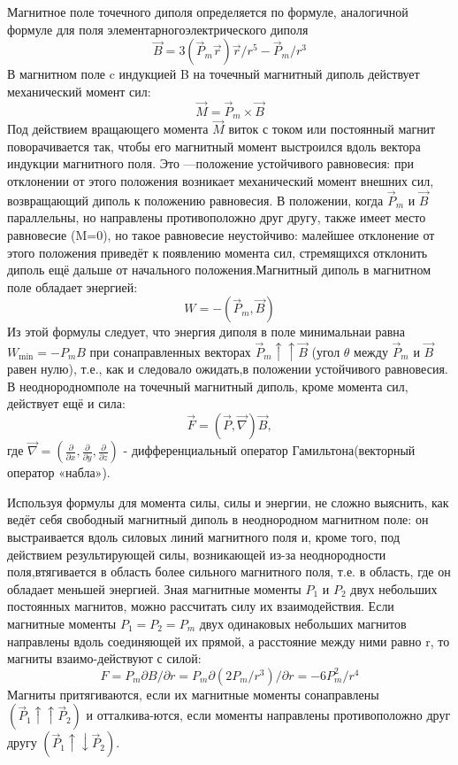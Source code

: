 \documentclass[a4paper, 12pt]{article}
\begin{document}
Магнитное поле точечного диполя определяется по формуле, аналогичной формуле для поля элементарногоэлектрического диполя
\begin{equation}\vec{B}=3\left(\vec{P}_{m} \vec{r}\right) \vec{r} / r^{5}-\vec{P}_{m} / r^{3}\end{equation}
В магнитном поле c индукцией B на точечный магнитный диполь действует механический момент сил:
\begin{equation}\vec{M}=\vec{P}_{m} \times \vec{B}\end{equation}
Под действием вращающего момента $\vec{M}$ виток с током или постоянный магнит поворачивается так, чтобы его магнитный момент выстроился вдоль вектора индукции магнитного поля. Это —положение устойчивого равновесия: при отклонении от этого положения возникает механический момент внешних сил, возвращающий диполь к положению равновесия. В положении, когда $\vec{P}_{m}$ и $\vec{B}$ параллельны, но направлены противоположно друг другу, также имеет место равновесие (M=0), но такое равновесие неустойчиво: малейшее отклонение от этого положения приведёт к появлению момента сил, стремящихся отклонить диполь ещё дальше от начального положения.Магнитный диполь в магнитном поле обладает энергией:
\begin{equation}W=-\left(\vec{P}_{m}, \vec{B}\right)\end{equation}
Из этой формулы следует, что энергия диполя в поле минимальнаи равна $W_{\min }=-P_{m} B$ при сонаправленных векторах $\vec{P}_{m} \uparrow \uparrow \vec{B}$ (угол $\theta$ между $\vec{P}_{m}$ и $\vec{B}$ равен нулю), т.е., как и следовало ожидать,в положении устойчивого равновесия.
В неоднородномполе на точечный магнитный диполь, кроме момента сил, действует ещё и сила:
\begin{equation}\vec{F}=(\vec{P}, \vec{\nabla}) \vec{B},\end{equation}
где $\vec{\nabla}=\left(\frac{\partial}{\partial x}, \frac{\partial}{\partial y}, \frac{\partial}{\partial z}\right)$ - дифференциальный оператор Гамильтона(векторный оператор «набла»).

Используя формулы для момента силы, силы и энергии, не сложно выяснить, как ведёт себя свободный магнитный диполь в неоднородном магнитном поле: он выстраивается вдоль силовых линий магнитного поля и, кроме того, под действием результирующей силы, возникающей из-за неоднородности поля,втягивается в область более сильного магнитного поля, т.е. в область, где он обладает меньшей энергией. Зная магнитные моменты $P_{1}$ и $P_{2}$ двух небольших постоянных магнитов, можно рассчитать силу их взаимодействия. Если магнитные моменты $P_{1}=P_{2}=P_{m}$ двух одинаковых небольших магнитов направлены вдоль соединяющей их прямой, а расстояние между ними равно r, то магниты  взаимо-действуют с силой: \begin{equation}F=P_{m} \partial B / \partial r=P_{m} \partial\left(2 P_{m} / r^{3}\right) / \partial r=-6 P_{m}^{2} / r^{4}\end{equation}Магниты притягиваются, если их магнитные моменты сонаправлены $\left(\vec{P}_{1} \uparrow \uparrow \vec{P}_{2}\right)$ и отталкива-ются, если моменты направлены противоположно друг другу $\left(\vec{P}_{1} \uparrow \downarrow \vec{P}_{2}\right)$. 
\end{document}
